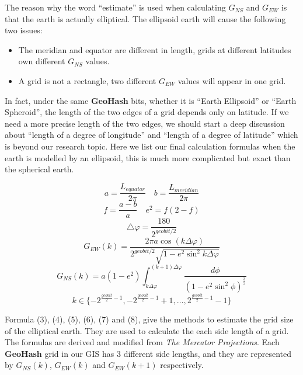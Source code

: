 \documentclass[conference]{IEEEtran}
\begin{document}
The reason why the word ``estimate'' is used when calculating $G_{NS}$ and $G_{EW}$ is that the earth is actually elliptical.
The ellipsoid earth will cause the following two issues:
\begin{itemize}
    \item The meridian and equator are different in length, grids at different latitudes own different $G_{NS}$ values.
    \item A grid is not a rectangle, two different $G_{EW}$ values will appear in one grid.
\end{itemize}

In fact, under the same \textbf{GeoHash} bits, whether it is ``Earth Ellipsoid'' or ``Earth Spheroid'', the length of the two edges of a grid depends only on latitude.
If we need a more precise length of the two edges, we should start a deep discussion about ``length of a degree of longitude'' and ``length of a degree of latitude'' which is beyond our research topic.
Here we list our final calculation formulas when the earth is modelled by an ellipsoid, this is much more complicated but exact than the spherical earth.

\begin{equation}
    a=\frac{L_{equator}}{2\pi}\quad
    b=\frac{L_{meridian}}{2\pi}
\end{equation}
\begin{equation}
    f=\frac{a-b}{a}\quad
    e^2=f(2-f)
\end{equation}
\begin{equation}
    \bigtriangleup\varphi=\frac{180}{2^{geobit/2}}
\end{equation}
\begin{equation}
    G_{EW}(k)=\frac{2\pi a\cos(k\Delta\varphi)}{2^{geobit/2}\sqrt{1-e^2\sin^2k\Delta\varphi}}
\end{equation}
\begin{equation}
    G_{NS}(k)=a(1-e^2)\int_{k\Delta\varphi}^{(k+1)\Delta\varphi}\frac{d\phi}{{(1-e^2\sin^2\phi)}^\frac32}
\end{equation}
\begin{equation}
    k\in\{-2^{\frac{geobit}{2}-1}, -2^{\frac{geobit}{2}-1}+1,\ldots, 2^{\frac{geobit}{2}-1}-1\}
\end{equation}

Formula (3), (4), (5), (6), (7) and (8), give the methods to estimate the grid size of the elliptical earth.
They are used to calculate the each side length of a grid.
The formulas are derived and modified from \textit{The Mercator Projections}\cite{osborne2013mercator}.
Each \textbf{GeoHash} grid in our GIS has 3 different side lengths, and they are represented by $G_{NS}(k)$, $G_{EW}(k)$ and $G_{EW}(k+1)$ respectively.
\end{document}
